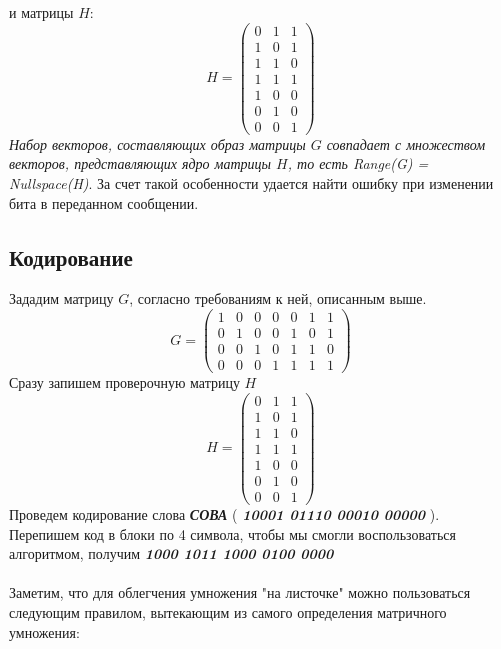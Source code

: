 \documentclass[a5paper, 10pt]{article}
\theoremstyle{definition}
\theoremstyle{plain}
\theoremstyle{remark}
\begin{document}
и матрицы $H$:
\begin{equation}
H = 
\begin{pmatrix}
 0 & 1 & 1\\
 1 & 0 & 1\\
 1 & 1 & 0\\
 1 & 1 & 1 \\
1 & 0 & 0\\
0 & 1 & 0 \\
0 & 0 & 1
\end{pmatrix}
\end{equation}
\textit{Набор векторов, составляющих образ матрицы $G$ совпадает с множеством векторов, представляющих ядро матрицы $H$, то есть Range(G) = Nullspace(H)}. За счет такой особенности удается найти ошибку при изменении бита в переданном сообщении.

\subsection{Кодирование}
Зададим матрицу $G$, согласно требованиям к ней, описанным выше.
\begin{equation}
G = 
\begin{pmatrix}
1 & 0 & 0 & 0 & 0 & 1 & 1\\
0 & 1 & 0 & 0 & 1 & 0 & 1\\
0 & 0 & 1 & 0 & 1 & 1 & 0\\
0 & 0 & 0 & 1 & 1 & 1 & 1
\end{pmatrix}
\end{equation}
Сразу запишем проверочную матрицу $H$
\begin{equation}
H = 
\begin{pmatrix}
 0 & 1 & 1\\
 1 & 0 & 1\\
 1 & 1 & 0\\
 1 & 1 & 1 \\
1 & 0 & 0\\
0 & 1 & 0 \\
0 & 0 & 1
\end{pmatrix}
\end{equation}
Проведем кодирование слова \textbf{\textit{СОВА}} (  \textbf{\textit{10001 01110 00010 00000}} ). \\
Перепишем код в блоки по 4 символа, чтобы мы смогли воспользоваться алгоритмом, получим   \textbf{\textit{1000 1011 1000 0100 0000}} \\\\
Заметим, что для облегчения умножения "на листочке" можно пользоваться следующим правилом, вытекающим из самого определения матричного умножения:\\
\end{document}
